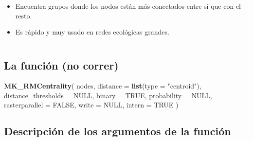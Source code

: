 \documentclass[
]{book}
\newenvironment{Shaded}{\begin{snugshade}}{\end{snugshade}}
\newcommand{\AttributeTok}[1]{\textcolor[rgb]{0.13,0.29,0.53}{#1}}
\newcommand{\ConstantTok}[1]{\textcolor[rgb]{0.56,0.35,0.01}{#1}}
\newcommand{\FunctionTok}[1]{\textcolor[rgb]{0.13,0.29,0.53}{\textbf{#1}}}
\newcommand{\NormalTok}[1]{#1}
\newcommand{\StringTok}[1]{\textcolor[rgb]{0.31,0.60,0.02}{#1}}
\providecommand{\tightlist}{%
  \setlength{\itemsep}{0pt}\setlength{\parskip}{0pt}}
\begin{document}
\begin{itemize}
\tightlist
\item
  Encuentra grupos donde los nodos están más conectados entre sí que con el resto.
\item
  Es rápido y muy usado en redes ecológicas grandes.
\end{itemize}

\begin{center}\rule{0.5\linewidth}{0.5pt}\end{center}

\subsection{La función (no correr)}\label{la-funciuxf3n-no-correr}

\begin{Shaded}
\begin{Highlighting}[]
\FunctionTok{MK\_RMCentrality}\NormalTok{(}
\NormalTok{  nodes,}
  \AttributeTok{distance =} \FunctionTok{list}\NormalTok{(}\AttributeTok{type =} \StringTok{"centroid"}\NormalTok{),}
  \AttributeTok{distance\_thresholds =} \ConstantTok{NULL}\NormalTok{,}
  \AttributeTok{binary =} \ConstantTok{TRUE}\NormalTok{,}
  \AttributeTok{probability =} \ConstantTok{NULL}\NormalTok{,}
  \AttributeTok{rasterparallel =} \ConstantTok{FALSE}\NormalTok{,}
  \AttributeTok{write =} \ConstantTok{NULL}\NormalTok{,}
  \AttributeTok{intern =} \ConstantTok{TRUE}
\NormalTok{)}
\end{Highlighting}
\end{Shaded}

\subsection{Descripción de los argumentos de la función}\label{descripciuxf3n-de-los-argumentos-de-la-funciuxf3n}
\end{document}
